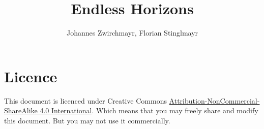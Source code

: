 \documentclass[11pt,a4paper,openany]{scrbook}
\begin{document}
\title{Endless Horizons}
\author{Johannes Zwirchmayr, Florian Stinglmayr}
\maketitle

\chapter{Licence}

  This document is licenced under Creative Commons
  \href{http://creativecommons.org/licenses/by-nc-sa/4.0/}
       {Attribution-NonCommercial-ShareAlike 4.0 International}.
  Which means that you may freely share and modify this document.
  But you may not use it commercially.






\end{document}
